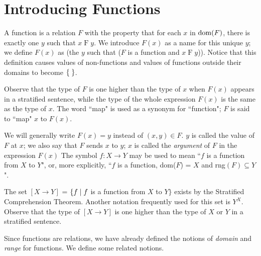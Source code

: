 \chapter[Introducing Functions]{Introducing Functions}


\begin{definition}
 A {\upshape function} is a
 relation $F$ with the property that for each $x$ in
 $\mathop{\mathrm{dom}}(F)$, there is exactly one $y$ such that $x \mathrel{F} y$.  We introduce
 $F(x)$ as  a name for this unique $y$; we 
 define $F(x)$ as (the $y$ such that ($F$ is a function and $x \mathrel{F}
 y$)). 
 Notice that this definition causes values of non-functions and values
 of functions outside their domains to become $\mbox{$\{\;\}$}$.
\end{definition}

Observe that the type of $F$ is one higher than the
type of $x$ when $F(x)$ appears in a stratified sentence, while the type of the whole expression $F(x)$ is the same as the type of $x$.
The word ``map" is used as a synonym for ``function"; $F$ is said to ``map" $x$
to $F(x)$.

We will generally write $F(x) = y$ instead of $(x,y) \in F$.
$y$ is called the value of $F$ at $x$; we also say that $F$ sends $x$
to $y$; $x$ is called the {\itshape argument\/} of $F$ in the expression
$F(x)$ The symbol $f:X \rightarrow Y$ may be used to mean ``$f$ is a
function from $X$ to $Y$", or, more explicitly, ``$f$ is a function,
dom($F$) = $X$ and rng$(F) \subseteq Y$".

\begin{definition}
 The set $[X \rightarrow Y]$ = $\{f \mid f$ is a function
 from $X$ to $Y\}$ exists by the Stratified Comprehension
 Theorem. Another notation frequently
 used for this set is $Y^X$.
 Observe that the type of $[X \rightarrow Y]$ is one
 higher than the type of $X$ or $Y$ in a stratified sentence.
\end{definition}

Since functions are relations, we have already defined the
notions of {\itshape domain} and {\itshape range\/} for
functions.  We define some related notions.

